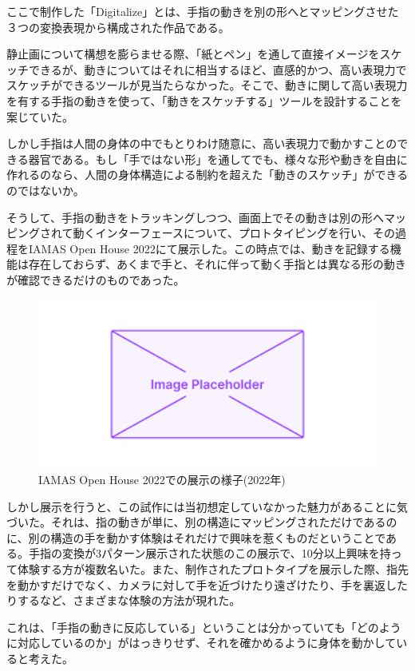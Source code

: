 ここで制作した「Digitalize」とは、手指の動きを別の形へとマッピングさせた３つの変換表現から構成された作品である。

静止画について構想を膨らませる際、「紙とペン」を通して直接イメージをスケッチできるが、動きについてはそれに相当するほど、直感的かつ、高い表現力でスケッチができるツールが見当たらなかった。そこで、動きに関して高い表現力を有する手指の動きを使って、「動きをスケッチする」ツールを設計することを案じていた。

しかし手指は人間の身体の中でもとりわけ随意に、高い表現力で動かすことのできる器官である。もし「手ではない形」を通してでも、様々な形や動きを自由に作れるのなら、人間の身体構造による制約を超えた「動きのスケッチ」ができるのではないか。

そうして、手指の動きをトラッキングしつつ、画面上でその動きは別の形へマッピングされて動くインターフェースについて、プロトタイピングを行い、その過程をIAMAS Open House 2022にて展示した。この時点では、動きを記録する機能は存在しておらず、あくまで手と、それに伴って動く手指とは異なる形の動きが確認できるだけのものであった。

\begin{figure}[H]
  \centering
  \includegraphics[width=15cm]{img/placeholder.png}
  \caption{IAMAS Open House 2022での展示の様子(2022年)}
  \label{fig:exhibit_2022}
\end{figure}

しかし展示を行うと、この試作には当初想定していなかった魅力があることに気づいた。それは、指の動きが単に、別の構造にマッピングされただけであるのに、別の構造の手を動かす体験はそれだけで興味を惹くものだということである。手指の変換が3パターン展示された状態のこの展示で、10分以上興味を持って体験する方が複数名いた。また、制作されたプロトタイプを展示した際、指先を動かすだけでなく、カメラに対して手を近づけたり遠ざけたり、手を裏返したりするなど、さまざまな体験の方法が現れた。

これは、「手指の動きに反応している」ということは分かっていても「どのように対応しているのか」がはっきりせず、それを確かめるように身体を動かしていると考えた。

